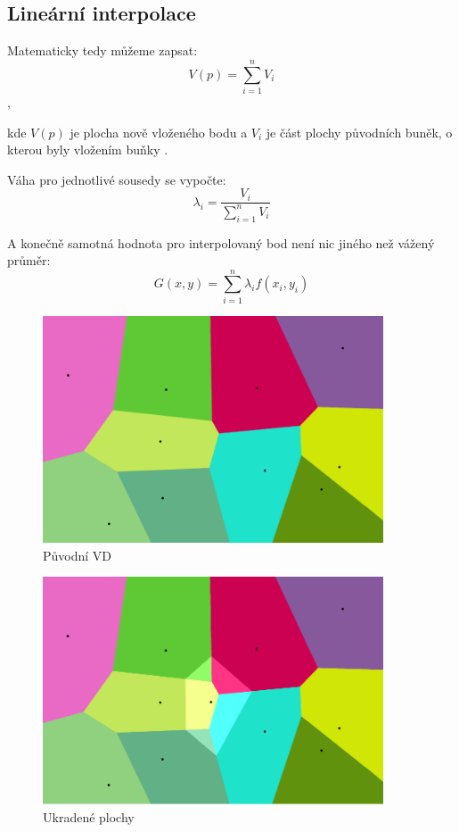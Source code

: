 \documentclass[12pt,a4paper]{article}
\begin{document}
\subsection{Lineární interpolace}
\bigskip
Matematicky tedy můžeme zapsat:
\newline
$$V(p)=\sum_{i=1}^n V_i$$,

\noindent kde $V(p)$ je plocha nově vloženého bodu a $V_i$ je část plochy původních buněk, o kterou byly vložením buňky .

\bigskip
\noindent Váha pro jednotlivé sousedy se vypočte:
\newline
$$\lambda_i = \frac{V_i}{\sum_{i=1}^n V_i}$$

\bigskip
\noindent A konečně samotná hodnota pro interpolovaný bod není nic jiného než vážený průměr:
\newline
$$G(x,y) = \sum_{i=1}^{n} \lambda_i  f(x_i, y_i)$$

\newpage
\begin{figure}[h!]
\centering
\includegraphics[width=0.9\textwidth]{img/canvas_0.png}
\caption{Původní VD}
\label{fig:fig:canvas0}
\end{figure}

\begin{figure}[h!]
\centering
\includegraphics[width=0.9\textwidth]{img/canvas_1.png}
\caption{Ukradené plochy}
\label{fig:fig:canvas1}
\end{figure}
\end{document}
